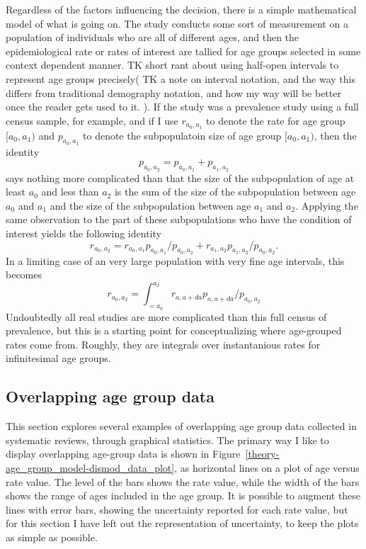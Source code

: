 Regardless of the factors influencing the decision, there is a simple
mathematical model of what is going on.  The study conducts some sort
of measurement on a population of individuals who are all of different
ages, and then the epidemiological rate or rates of interest are
tallied for age groups selected in some context dependent manner. TK
short rant about using half-open intervals to represent age groups
precisely( TK a note on interval notation, and the way this differs
from traditional demography notation, and how my way will be better
once the reader gets used to it.  ). If the study was a prevalence
study using a full census sample, for example, and if I use
$r_{a_0,a_1}$ to denote the rate for age group $[a_0, a_1)$ and
  $p_{a_0,a_1}$ to denote the subpopulatoin size of age group $[a_0,
    a_1)$, then the identity
\[
p_{a_0, a_2} = p_{a_0,a_1} + p_{a_1,a_2}
\]
says nothing more complicated than that the size of the subpopulation
of age at least $a_0$ and less than $a_2$ is the sum of the size of
the subpopulation between age $a_0$ and $a_1$ and the size of the subpopulation between age $a_1$ and $a_2$.  Applying the same observation to the part of these subpopulations who have the condition of interest yields the following identity
\[
r_{a_0,a_2} = r_{a_0,a_1}p_{a_0,a_1}/p_{a_0,a_2} + r_{a_1,a_2}p_{a_1,a_2}/p_{a_0,a_2}.
\]
In a limiting case of an very large population with very fine age intervals, this becomes
\[
r_{a_0,a_2} = \int_{=a_0}^{a_2} r_{a,a+da}p_{a,a+da}/p_{a_0,a_2}
\]
Undoubtedly all real studies are more complicated than this full
census of prevalence, but this is a starting point for conceptualizing
where age-grouped rates come from.  Roughly, they are integrals over
instantanious rates for infinitesimal age groups.

\subsection{Overlapping age group data}
This section explores several examples of overlapping age group data
collected in systematic reviews, through graphical statistics.  The
primary way I like to display overlapping age-group data is shown in
Figure~\ref{theory-age_group_model-dismod_data_plot}, as horizontal
lines on a plot of age versus rate value.  The level of the bars shows
the rate value, while the width of the bars shows the range of ages
included in the age group. It is possible to augment these lines with
error bars, showing the uncertainty reported for each rate value, but
for this section I have left out the representation of uncertainty, to
keep the plots as simple as possible.

